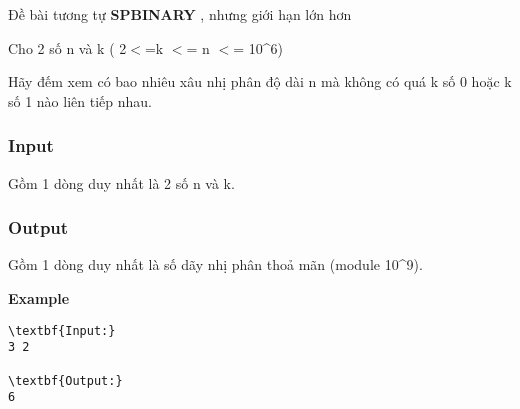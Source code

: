 



   Đề bài tương tự   \textbf{    SPBINARY   }   , nhưng giới hạn lớn hơn  

   Cho 2 số n và k ( 2$<$=k $<$= n $<$= 10\textasciicircum6)  

   Hãy đếm xem có bao nhiêu xâu nhị phân độ dài n mà không có quá k số 0 hoặc k số 1 nào liên tiếp nhau.  

\subsubsection{   Input  }

   Gồm 1 dòng duy nhất là 2 số n và k.  

\subsubsection{   Output  }

   Gồm 1 dòng duy nhất là số dãy nhị phân thoả mãn (module 10\textasciicircum9).  

\textbf{    Example   }
\begin{verbatim}
\textbf{Input:}
3 2

\textbf{Output:}
6\end{verbatim}